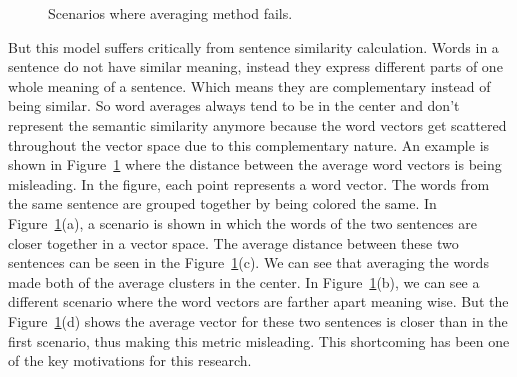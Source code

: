 \begin{figure}
    \centering
    
    \caption{Scenarios where averaging method fails.}
    \label{fig:sarkar-problem}
\end{figure}

But this model suffers critically from sentence similarity calculation. Words in a sentence do not have similar meaning, instead they express different parts of one whole meaning of a sentence. Which means they are complementary instead of being similar. So word averages always tend to be in the center and don't represent the semantic similarity anymore because the word vectors get scattered throughout the vector space due to this complementary nature. An example is shown in Figure~\ref{fig:sarkar-problem} where the distance between the average word vectors is being misleading. In the figure, each point represents a word vector. The words from the same sentence are grouped together by being colored the same. In Figure~\ref{fig:sarkar-problem}(a), a scenario is shown in which the words of the two sentences are closer together in a vector space. The average distance between these two sentences can be seen in the Figure~\ref{fig:sarkar-problem}(c). We can see that averaging the words made both of the average clusters in the center. In Figure~\ref{fig:sarkar-problem}(b), we can see a different scenario where the word vectors are farther apart meaning wise. But the Figure~\ref{fig:sarkar-problem}(d) shows the average vector for these two sentences is closer than in the first scenario, thus making this metric misleading. This shortcoming has been one of the key motivations for this research.